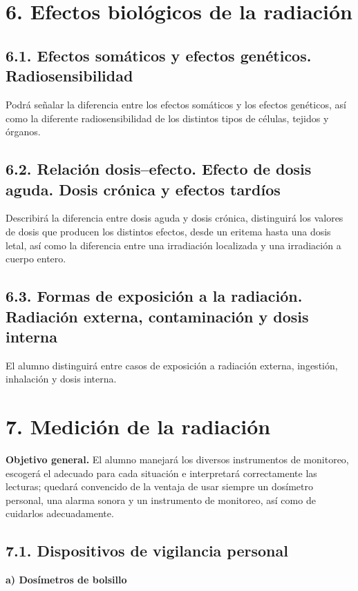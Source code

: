\section*{6. Efectos biológicos de la radiación }

\subsection*{6.1. Efectos somáticos y efectos genéticos. Radiosensibilidad}
Podrá señalar la diferencia entre los efectos somáticos y los efectos genéticos, así como la diferente radiosensibilidad de los distintos tipos de células, tejidos y órganos.

\subsection*{6.2. Relación dosis--efecto. Efecto de dosis aguda. Dosis crónica y efectos tardíos}
Describirá la diferencia entre dosis aguda y dosis crónica, distinguirá los valores de dosis que producen los distintos efectos, desde un eritema hasta una dosis letal, así como la diferencia entre una irradiación localizada y una irradiación a cuerpo entero.

\subsection*{6.3. Formas de exposición a la radiación. Radiación externa, contaminación y dosis interna}
El alumno distinguirá entre casos de exposición a radiación externa, ingestión, inhalación y dosis interna.

\section*{7. Medición de la radiación }
\textbf{Objetivo general.} El alumno manejará los diversos instrumentos de monitoreo, escogerá el adecuado para cada situación e interpretará correctamente las lecturas; quedará convencido de la ventaja de usar siempre un dosímetro personal, una alarma sonora y un instrumento de monitoreo, así como de cuidarlos adecuadamente.

\subsection*{7.1. Dispositivos de vigilancia personal}

\textbf{a) Dosímetros de bolsillo }

